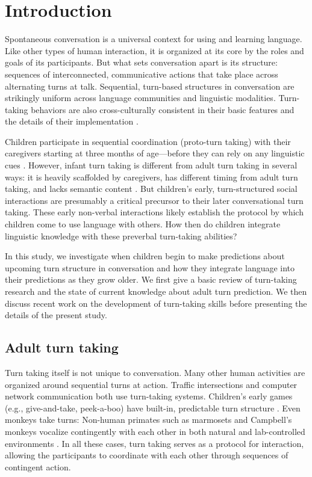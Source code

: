 \documentclass[authoryear, 12pt]{elsarticle}
\begin{document}
\linenumbers

\section*{Introduction}
\label{sec:intro}

Spontaneous conversation is a universal context for using and learning language. Like other types of human interaction, it is organized at its core by the roles and goals of its participants. But what sets conversation apart is its structure: sequences of interconnected, communicative actions that take place across alternating turns at talk. Sequential, turn-based structures in conversation are strikingly uniform across language communities and linguistic modalities. Turn-taking behaviors are also cross-culturally consistent in their basic features and the details of their implementation \citep{de-vos2015, dingemanse2013, stivers2009}.

Children participate in sequential coordination (proto-turn taking) with their caregivers starting at three months of age---before they can rely on any linguistic cues \citep[see, among others, ][]{bateson1975, hilbrink2015, jaffe2001, snow1977}. However, infant turn taking is different from adult turn taking in several ways: it is heavily scaffolded by caregivers, has different timing from adult turn taking, and lacks semantic content \citep{hilbrink2015, jaffe2001}. But children's early, turn-structured social interactions are presumably a critical precursor to their later conversational turn taking. These early non-verbal interactions likely establish the protocol by which children come to use language with others. How then do children integrate linguistic knowledge with these preverbal turn-taking abilities?

In this study, we investigate when children begin to make predictions about upcoming turn structure in conversation and how they integrate language into their predictions as they grow older. We first give a basic review of turn-taking research and the state of current knowledge about adult turn prediction. We then discuss recent work on the development of turn-taking skills before presenting the details of the present study.

\subsection*{Adult turn taking}

Turn taking itself is not unique to conversation. Many other human activities are organized around sequential turns at action. Traffic intersections and computer network communication both use turn-taking systems. Children's early games (e.g., give-and-take, peek-a-boo) have built-in, predictable turn structure \citep{ratner1978, ross1987}. Even monkeys take turns: Non-human primates such as marmosets and Campbell's monkeys vocalize contingently with each other in both natural and lab-controlled environments \citep{lemasson2011, takahashi2013}. In all these cases, turn taking serves as a protocol for interaction, allowing the participants to coordinate with each other through sequences of contingent action.
\end{document}
